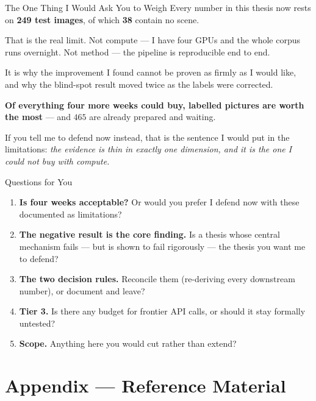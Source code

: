 \documentclass[aspectratio=169,11pt]{beamer}
\begin{document}
\begin{frame}{The One Thing I Would Ask You to Weigh}
\small
Every number in this thesis now rests on \textbf{249 test images}, of which \textbf{38} contain no scene.
\vspace{3mm}

That is the real limit. Not compute --- I have four GPUs and the whole corpus runs overnight. Not method --- the pipeline is reproducible end to end.
\vspace{4mm}

\small
It is why the improvement I found cannot be proven as firmly as I would like, and why the blind-spot result moved twice as the labels were corrected.
\vspace{3mm}

\textbf{Of everything four more weeks could buy, labelled pictures are worth the most} --- and $465$ are already prepared and waiting.
\vspace{3mm}

\small If you tell me to defend now instead, that is the sentence I would put in the limitations: \emph{the evidence is thin in exactly one dimension, and it is the one I could not buy with compute.}
\end{frame}

\begin{frame}{Questions for You}
\begin{enumerate}
  \setlength\itemsep{4mm}
  \item \textbf{Is four weeks acceptable?} Or would you prefer I defend now with these documented as limitations?
  \item \textbf{The negative result is the core finding.} Is a thesis whose central mechanism fails --- but is shown to fail rigorously --- the thesis you want me to defend?
  \item \textbf{The two decision rules.} Reconcile them (re-deriving every downstream number), or document and leave?
  \item \textbf{Tier 3.} Is there any budget for frontier API calls, or should it stay formally untested?
  \item \textbf{Scope.} Anything here you would cut rather than extend?
\end{enumerate}
\end{frame}

\appendix
\section{Appendix --- Reference Material}
\end{document}

